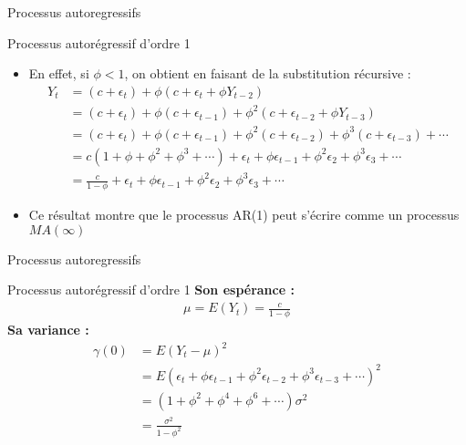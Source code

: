 \documentclass{beamer}
\begin{document}
\begin{frame}{Processus autoregressifs}
\begin{block}{Processus autorégressif d’ordre 1}
\begin{itemize}
\item  En effet, si $\phi < 1$, on obtient en faisant de la substitution récursive :
\begin{align*}
Y_t & =(c+\epsilon_t)+\phi(c+\epsilon_t+\phi Y_{t-2})\\ & = (c+\epsilon_t) +\phi (c+\epsilon_{t-1})+\phi^2( c+\epsilon_{t-2}+\phi Y_{t-3})\\ & = (c+\epsilon_t) +\phi (c+\epsilon_{t-1})+ \phi^2 (c+\epsilon_{t-2})+\phi^3 (c+\epsilon_{t-3})+\cdots \\ & = c(1+\phi+\phi^2+\phi^3+\cdots)+\epsilon_t+\phi \epsilon_{t-1}+\phi^2\epsilon_{2}+\phi^3\epsilon_{3}+\cdots \\ & = \frac{c}{1-\phi}+\epsilon_t+\phi \epsilon_{t-1}+\phi^2\epsilon_{2}+\phi^3\epsilon_{3}+\cdots
\end{align*}
\item Ce résultat montre que le processus AR(1) peut s’écrire comme un processus $MA(\infty)$
\end{itemize}
\end{block}
\end{frame}


\begin{frame}{Processus autoregressifs}
\begin{block}{Processus autorégressif d’ordre 1}
\textbf{Son espérance :}
\begin{align*}
\mu = E(Y_t)=\frac{c}{1-\phi}
\end{align*}
\textbf{Sa variance :}
\begin{align*}
\gamma(0)&=E(Y_t-\mu)^2 \\ & = E(\epsilon_t+\phi \epsilon_{t-1}+\phi^2 \epsilon_{t-2}+\phi^3 \epsilon_{t-3}+\cdots)^2 \\ & = (1+\phi^2+\phi^4+\phi^6+\cdots)\sigma^2 \\ & = \frac{\sigma^2}{1-\phi^2}
\end{align*}
\end{block}
\end{frame}
\end{document}

